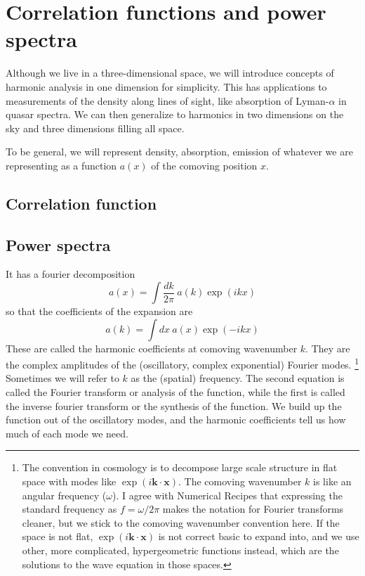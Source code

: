 \chapter{Correlation functions and power spectra}

Although we live in a three-dimensional space, we will introduce concepts of harmonic analysis in one dimension for simplicity.  This has applications to measurements of the density along lines of sight, like absorption of Lyman-$\alpha$ in quasar spectra.  We can then generalize to harmonics in two dimensions on the sky and three dimensions filling all space.

To be general, we will represent density, absorption, emission of whatever we are representing as a function $a(x)$ of the comoving position $x$.

\section{Correlation function}





\section{Power spectra}
It has a fourier decomposition
\begin{equation}
  a(x) = \int \frac{dk}{2\pi}\ a(k) \exp(i kx) 
\end{equation}
so that the coefficients of the expansion are 
\begin{equation}
  a(k) = \int dx\ a(x) \exp(-i kx)
\end{equation}
These are called the harmonic coefficients at comoving wavenumber $k$.  They are the complex amplitudes of the (oscillatory, complex exponential) Fourier modes.%
%
\footnote{The convention in cosmology is to decompose large scale structure in flat space with modes like $\exp(i \mathbf{k} \cdot \mathbf{x})$.  The comoving wavenumber $k$ is like an angular frequency ($\omega$).  I agree with Numerical Recipes \citep{} that expressing the standard frequency as $f = \omega/2\pi$ makes the notation for Fourier transforms cleaner, but  we stick to the comoving wavenumber convention here.  If the space is not flat, $\exp(i \mathbf{k}\cdot \mathbf{x})$ is not correct basic to expand into, and we use other, more complicated, hypergeometric functions instead, which are the solutions to the wave equation in those spaces.}  Sometimes we will refer to $k$ as the (spatial) frequency.
The second equation is called the Fourier transform or analysis of the function, while the first is called the inverse fourier transform or the synthesis of the function.  We build up the function out of the oscillatory modes, and the harmonic coefficients tell us how much of each mode we need.

